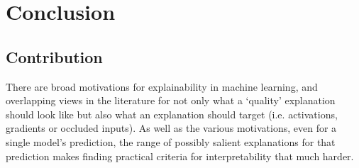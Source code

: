 \documentclass[main]{subfiles}
\begin{document}
\chapter{Conclusion}








\section{Contribution}
There are broad motivations for explainability in machine learning, and overlapping views in the literature for not only what a `quality' explanation should look like but also what an explanation should target (i.e. activations, gradients or occluded inputs). As well as the various motivations, even for a single model's prediction, the range of possibly salient explanations for that prediction makes finding practical criteria for interpretability that much harder.
\end{document}
